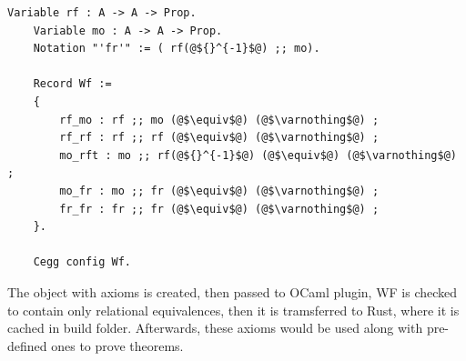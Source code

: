 \vspace{0.5cm}
\begin{lstlisting}[language=coq]
    Variable rf : A -> A -> Prop.
    Variable mo : A -> A -> Prop.
    Notation "'fr'" := ( rf(@${}^{-1}$@) ;; mo).

    Record Wf :=
    { 
        rf_mo : rf ;; mo (@$\equiv$@) (@$\varnothing$@) ;
        rf_rf : rf ;; rf (@$\equiv$@) (@$\varnothing$@) ;
        mo_rft : mo ;; rf(@${}^{-1}$@) (@$\equiv$@) (@$\varnothing$@) ;
        mo_fr : mo ;; fr (@$\equiv$@) (@$\varnothing$@) ; 
        fr_fr : fr ;; fr (@$\equiv$@) (@$\varnothing$@) ;
    }.

    Cegg config Wf.
\end{lstlisting}

The object with axioms is created, then passed to OCaml plugin, WF is checked to contain only relational equivalences, then it is tramsferred to Rust, where it is cached in build folder. Afterwards, these axioms would be used along with pre-defined ones to prove theorems.